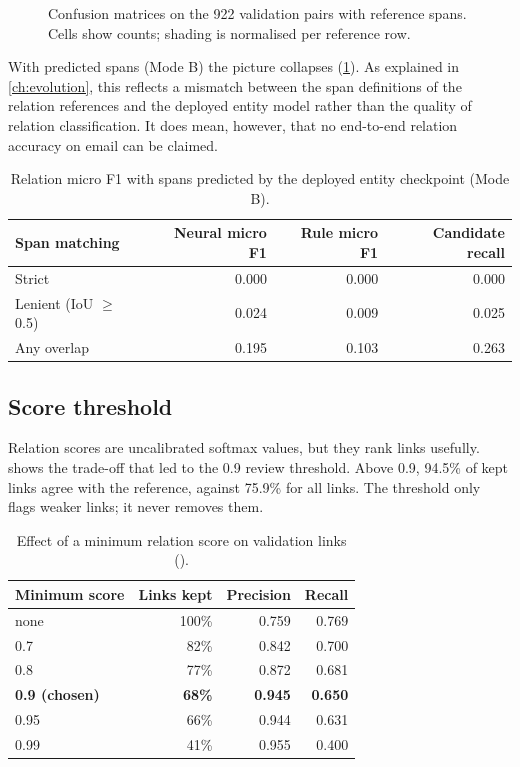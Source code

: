 \begin{figure}[t]
\centering
{}
\caption[Relation confusion matrices]{Confusion matrices on the 922 validation pairs with reference spans. Cells show counts; shading is normalised per reference row.}
\label{fig:relconf}
\end{figure}

With predicted spans (Mode B) the picture collapses (\cref{tab:modeb}). As explained in \cref{ch:evolution}, this reflects a mismatch between the span definitions of the relation references and the deployed entity model rather than the quality of relation classification. It does mean, however, that no end-to-end relation accuracy on email can be claimed.

\begin{table}[h]
\centering
\caption{Relation micro F1 with spans predicted by the deployed entity checkpoint (Mode B).}
\label{tab:modeb}
\footnotesize
\begin{tabular}{@{}lrrr@{}}
\toprule
Span matching & Neural micro F1 & Rule micro F1 & Candidate recall \\
\midrule
Strict & 0.000 & 0.000 & 0.000 \\
Lenient (IoU $\ge$ 0.5) & 0.024 & 0.009 & 0.025 \\
Any overlap & 0.195 & 0.103 & 0.263 \\
\bottomrule
\end{tabular}
\end{table}

\subsection{Score threshold}
Relation scores are uncalibrated softmax values, but they rank links usefully.  shows the trade-off that led to the 0.9 review threshold. Above 0.9, 94.5\% of kept links agree with the reference, against 75.9\% for all links. The threshold only flags weaker links; it never removes them.

\begin{table}[h]
\centering
\caption{Effect of a minimum relation score on validation links ().}
\label{tab:threshold}
\footnotesize
\begin{tabular}{@{}lrrr@{}}
\toprule
Minimum score & Links kept & Precision & Recall \\
\midrule
none & 100\% & 0.759 & 0.769 \\
0.7 & 82\% & 0.842 & 0.700 \\
0.8 & 77\% & 0.872 & 0.681 \\
\textbf{0.9 (chosen)} & \textbf{68\%} & \textbf{0.945} & \textbf{0.650} \\
0.95 & 66\% & 0.944 & 0.631 \\
0.99 & 41\% & 0.955 & 0.400 \\
\bottomrule
\end{tabular}
\end{table}

